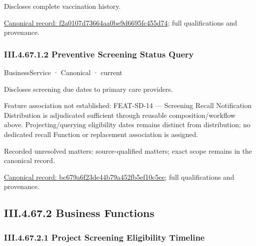 Discloses complete vaccination history.


{\footnotesize \href{../../../../continuum/business/business-service/f2a0107d73664aa0be9d6695fc455d74.md}{Canonical record: f2a0107d73664aa0be9d6695fc455d74}; full qualifications and provenance.}\par
\subsubsection*{III.4.67.1.2 Preventive Screening Status Query}
\label{navigation:III.4.67.1.2}

\label{element:bc679a6f23de44b79a452fb5ef10c5ee}
{\small BusinessService · Canonical · current}\par

Discloses screening due dates to primary care providers.



Feature association not established: FEAT-SD-14 — Screening Recall Notification Distribution is adjudicated sufficient through reusable composition/workflow above. Projecting/querying eligibility dates remains distinct from distribution; no dedicated recall Function or replacement association is assigned.


{\small Recorded unresolved matters: source-qualified matters; exact scope remains in the canonical record.}\par
{\footnotesize \href{../../../../continuum/business/business-service/bc679a6f23de44b79a452fb5ef10c5ee.md}{Canonical record: bc679a6f23de44b79a452fb5ef10c5ee}; full qualifications and provenance.}\par
\subsection*{III.4.67.2 Business Functions}
\label{navigation:III.4.67.2}

\subsubsection*{III.4.67.2.1 Project Screening Eligibility Timeline}
\label{navigation:III.4.67.2.1}

